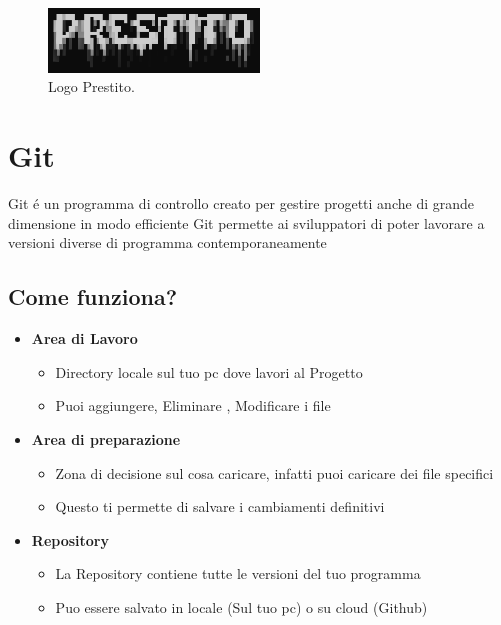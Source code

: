 \documentclass[a4paper,12pt]{article}
\begin{document}
\begin{figure}[h!]
    \centering
    \includegraphics[width=0.5\textwidth]{Prestito.png}
    \caption{Logo Prestito.}
    \label{fig:etichetta}
\end{figure}

\newpage

\section{Git}
 Git é un programma di controllo creato per gestire progetti anche di grande dimensione in modo efficiente
 Git permette ai sviluppatori di poter lavorare a versioni diverse di programma contemporaneamente

\begin{center}
    \subsection *{Come funziona?}
\end{center}
 \begin{itemize}
    \item \textbf{Area di Lavoro}
    \begin{itemize}
        \item Directory locale sul tuo pc dove lavori al Progetto
        \item Puoi aggiungere, Eliminare , Modificare i file
    \end{itemize}
    \item \textbf{Area di preparazione}
    \begin{itemize}
        \item Zona di decisione sul cosa caricare, infatti puoi caricare dei file specifici
        \item Questo ti permette di salvare i cambiamenti definitivi
    \end{itemize}
    \item \textbf{Repository}
    \begin{itemize}
        \item La Repository contiene tutte le versioni del tuo programma
        \item Puo essere salvato in locale (Sul tuo pc) o su cloud (Github)
    \end{itemize}
 \end{itemize}
\end{document}
